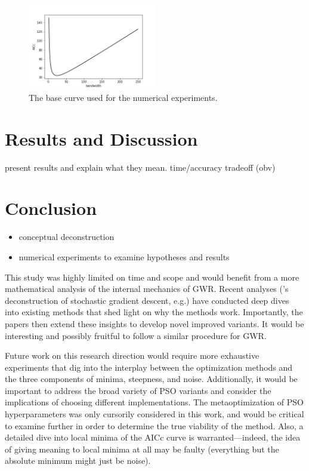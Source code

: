 \documentclass[letterpaper,12pt,twocolumn]{article}
\begin{document}
\begin{figure}
    \centering
    \includegraphics[width=0.5\textwidth]{../figures/baseline.png} 
    \caption{The base curve used for the numerical experiments.}
    \label{fig:baseline}
\end{figure}

\section{Results and Discussion}
\label{sec:results}
present results and explain what they mean. time/accuracy tradeoff (obv)

\section{Conclusion}
\label{sec:conclusion}
\begin{itemize}
    \item conceptual deconstruction
    \item numerical experiments to examine hypotheses and results
\end{itemize}

This study was highly limited on time and scope and would benefit from a more mathematical analysis of the internal mechanics of GWR. Recent analyses (\cite{Feng2021}'s deconstruction of stochastic gradient descent, e.g.) have conducted deep dives into existing methods that shed light on why the methods work. Importantly, the papers then extend these insights to develop novel improved variants. It would be interesting and possibly fruitful to follow a similar procedure for GWR.

Future work on this research direction would require more exhaustive experiments that dig into the interplay between the optimization methods and the three components of minima, steepness, and noise. Additionally, it would be important to address the broad variety of PSO variants and consider the implications of choosing different implementations. The metaoptimization of PSO hyperparameters was only cursorily considered in this work, and would be critical to examine further in order to determine the true viability of the method. Also, a detailed dive into local minima of the AICc curve is warranted---indeed, the idea of giving meaning to local minima at all may be faulty (everything but the absolute minimum might just be noise).
\end{document}
